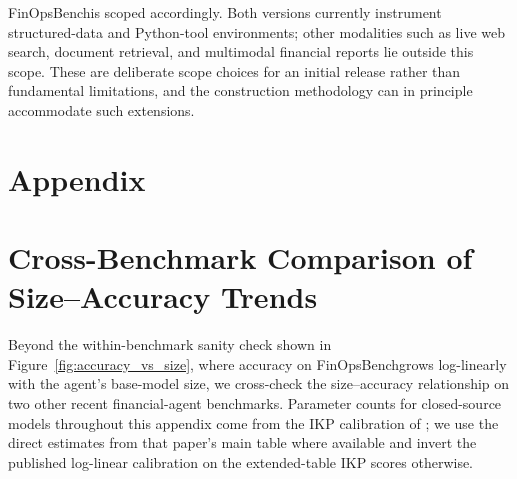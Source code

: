 \documentclass[11pt]{article}
\newcommand{\datasetname}{FinOpsBench}\xspace
\newcommand{\groundedfinqa}{FinOpsBench-v2}\xspace
\begin{document}
\datasetname is scoped accordingly. Both versions currently instrument structured-data and Python-tool environments; other modalities such as live web search, document retrieval, and multimodal financial reports lie outside this scope. These are deliberate scope choices for an initial release rather than fundamental limitations, and the construction methodology can in principle accommodate such extensions.




\appendix

\section*{Appendix}

\section{Cross-Benchmark Comparison of Size--Accuracy Trends}
\label{app:cross_benchmark}

Beyond the within-benchmark sanity check shown in Figure~\ref{fig:accuracy_vs_size}, where accuracy on \datasetname grows log-linearly with the agent's base-model size, we cross-check the size--accuracy relationship on two other recent financial-agent benchmarks. Parameter counts for closed-source models throughout this appendix come from the IKP calibration of \citet{li2026incompressible}; we use the direct estimates from that paper's main table where available and invert the published log-linear calibration on the extended-table IKP scores otherwise.
\end{document}
